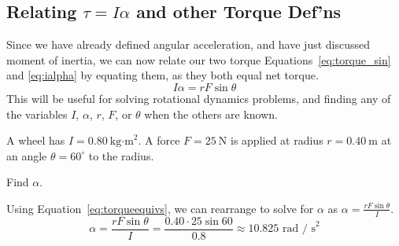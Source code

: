 \subsection{Relating $\tau = I \alpha$ and other Torque Def'ns}
Since we have already defined angular acceleration, and have just discussed moment of inertia, we can now relate our two torque Equations~\ref{eq:torque_sin} and \ref{eq:ialpha} by equating them, as they both equal net torque.
\begin{equation}
  I \alpha = r F \sin\theta
  \label{eq:torqueequivs}
\end{equation}
This will be useful for solving rotational dynamics problems, and finding any of the variables $I$, $\alpha$, $r$, $F$, or $\theta$ when the others are known.
\begin{Exercise}[title=Angular Acceleration of a Wheel,label=angacc1]
A wheel has \(I=0.80\ \text{kg·m}^2\). A force \(F=25\ \text{N}\) is applied at radius \(r=0.40\ \text{m}\) at an angle \(\theta=60^\circ\) to the radius.

Find \(\alpha\).

\end{Exercise}
\begin{Answer}[ref=angacc1]
Using Equation~\ref{eq:torqueequivs}, we can rearrange to solve for $\alpha$ as $\alpha = \frac{r F \sin\theta}{I}$.
\[
\alpha = \frac{r F \sin\theta}{I} = \frac{0.40 \cdot 25 \sin60}{0.8} \approx 10.825 \text{ rad / s}^2
\]

\end{Answer}


